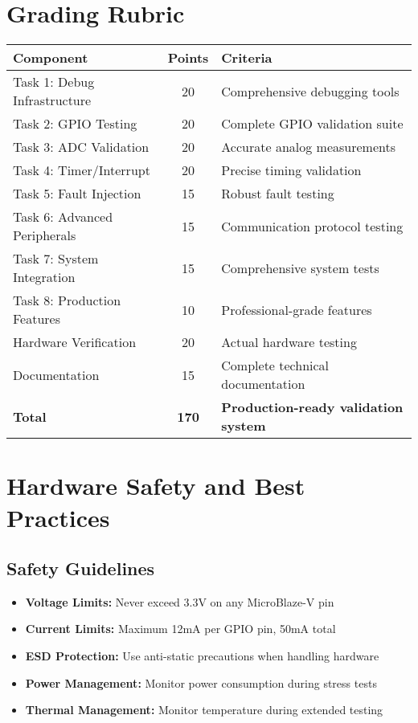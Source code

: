 \documentclass[11pt,a4paper]{article}
\begin{document}
\section{Grading Rubric}

\begin{center}
\begin{tabular}{|l|c|l|}
\hline
\textbf{Component} & \textbf{Points} & \textbf{Criteria} \\
\hline
Task 1: Debug Infrastructure & 20 & Comprehensive debugging tools \\
Task 2: GPIO Testing & 20 & Complete GPIO validation suite \\
Task 3: ADC Validation & 20 & Accurate analog measurements \\
Task 4: Timer/Interrupt & 20 & Precise timing validation \\
Task 5: Fault Injection & 15 & Robust fault testing \\
Task 6: Advanced Peripherals & 15 & Communication protocol testing \\
Task 7: System Integration & 15 & Comprehensive system tests \\
Task 8: Production Features & 10 & Professional-grade features \\
Hardware Verification & 20 & Actual hardware testing \\
Documentation & 15 & Complete technical documentation \\
\hline
\textbf{Total} & \textbf{170} & \textbf{Production-ready validation system} \\
\hline
\end{tabular}
\end{center}

\section{Hardware Safety and Best Practices}

\subsection{Safety Guidelines}
\begin{itemize}
    \item \textbf{Voltage Limits:} Never exceed 3.3V on any MicroBlaze-V pin
    \item \textbf{Current Limits:} Maximum 12mA per GPIO pin, 50mA total
    \item \textbf{ESD Protection:} Use anti-static precautions when handling hardware
    \item \textbf{Power Management:} Monitor power consumption during stress tests
    \item \textbf{Thermal Management:} Monitor temperature during extended testing
\end{itemize}
\end{document}
